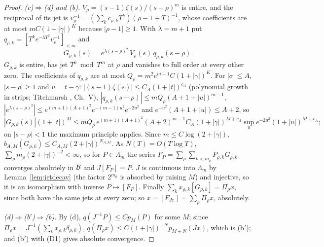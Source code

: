 \begin{proof}
\emph{(c)$\Rightarrow$(d) and (b).}
$V_\rho=(s-1)\zeta(s)/(s-\rho)^m$ is entire, and the reciprocal of its jet is $v_\rho^{-1}=(\sum_kc_{\rho,k}T^k)(\rho-1+T)^{-1}$, whose coefficients are at most $mC(1+|\gamma|)^K$ because $|\rho-1|\ge1$.
With $\lambda=m+1$ put $q_{\rho,k}=[T^ke^{-\lambda T^2}v_\rho^{-1}]_{<m}$ and
\[
G_{\rho,k}(s)=e^{\lambda(s-\rho)^2}\,V_\rho(s)\,q_{\rho,k}(s-\rho).
\]
$G_{\rho,k}$ is entire, has jet $T^k\bmod T^m$ at $\rho$ and vanishes to full order at every other zero. The coefficients of $q_{\rho,k}$ are at most $Q_\rho=m^2e^{m+1}C(1+|\gamma|)^K$.
For $|\sigma|\le A$, $|s-\rho|\ge1$ and $u=t-\gamma$: $|(s-1)\zeta(s)|\le C_A(1+|t|)^{c_A}$ (polynomial growth in strips; Titchmarsh \cite{Titchmarsh}, Ch.~V), $|q_{\rho,k}(s-\rho)|\le mQ_\rho(A+1+|u|)^{m-1}$, $|e^{\lambda(s-\rho)^2}|\le e^{(m+1)(A+1)^2}e^{-(m-1)u^2}e^{-2u^2}$ and $e^{-u^2}(A+1+|u|)\le A+2$, so
\[
|G_{\rho,k}(s)|(1+|t|)^M\le mQ_\rho\,e^{(m+1)(A+1)^2}(A+2)^{m-1}C_A(1+|\gamma|)^{M+c_A}\sup_ue^{-2u^2}(1+|u|)^{M+c_A};
\]
on $|s-\rho|<1$ the maximum principle applies. Since $m\le C\log(2+|\gamma|)$, $b_{A,M}(G_{\rho,k})\le C_{A,M}(2+|\gamma|)^{N_{A,M}}$.
As $N(T)=O(T\log T)$, $\sum_\rho m_\rho(2+|\gamma|)^{-2}<\infty$, so for $P\in\Lambda_m$ the series $F_P=\sum_\rho\sum_{k<m_\rho}P_{\rho,k}G_{\rho,k}$ converges absolutely in $\mathcal{B}$ and $J[F_P]=P$.
$J$ is continuous into $\Lambda_m$ by Lemma~\ref{lem:jetdecay} (the factor $2^{m_\rho}$ is absorbed by raising $M$) and injective, so it is an isomorphism with inverse $P\mapsto[F_P]$.
Finally $\sum_kx_{\rho,k}[G_{\rho,k}]=\Pi_\rho x$, since both have the same jets at every zero; so $x=[F_{Jx}]=\sum_\rho\Pi_\rho x$, absolutely.

\emph{(d)$\Rightarrow$(b$'$)$\Rightarrow$(b).} By (d), $q(J^{-1}P)\le Cp_M(P)$ for some $M$; since $\Pi_\rho x=J^{-1}(\sum_kx_{\rho,k}\delta_{\rho,k})$, $q(\Pi_\rho x)\le C(1+|\gamma|)^{-N}p_{M+N}(Jx)$, which is (b$'$); and (b$'$) with (D1) gives absolute convergence.
\end{proof}

